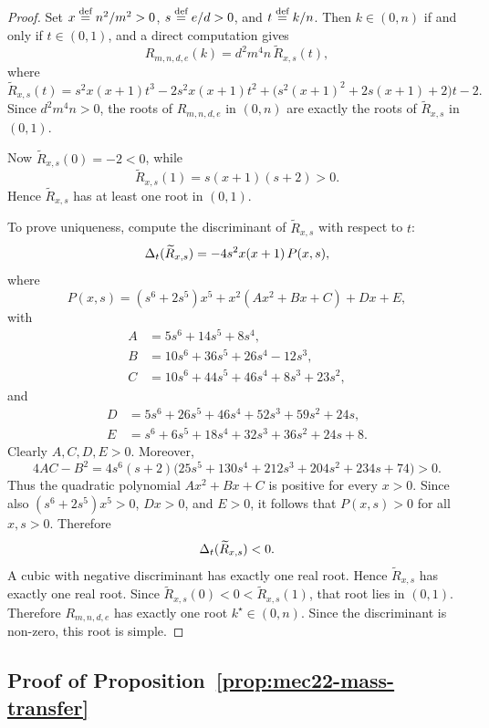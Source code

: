 \begin{proof}
Set \(x\stackrel{\text{def}}{=} n^2/m^2>0\), \(s\stackrel{\text{def}}{=} e/d>0\), and \(t\stackrel{\text{def}}{=} k/n\). Then \(k\in(0,n)\) if and only if \(t\in(0,1)\), and a direct computation gives
\[
R_{m,n,d,e}(k)=d^2m^4n\,\widetilde R_{x,s}(t),
\]
where
\[
\widetilde R_{x,s}(t)
=
s^2x(x+1)t^3-2s^2x(x+1)t^2+\bigl(s^2(x+1)^2+2s(x+1)+2\bigr)t-2.
\]
Since \(d^2m^4n>0\), the roots of \(R_{m,n,d,e}\) in \((0,n)\) are exactly the roots of \(\widetilde R_{x,s}\) in \((0,1)\).

Now \(\widetilde R_{x,s}(0)=-2<0\), while
\[
\widetilde R_{x,s}(1)=s(x+1)(s+2)>0.
\]
Hence \(\widetilde R_{x,s}\) has at least one root in \((0,1)\).

To prove uniqueness, compute the discriminant of \(\widetilde R_{x,s}\) with respect to \(t\):
\[
\Delta_t(\widetilde R_{x,s})=-4s^2x(x+1)\,P(x,s),
\]
where
\[
P(x,s)=(s^6+2s^5)x^5+x^2(Ax^2+Bx+C)+Dx+E,
\]
with
\[
\begin{aligned}
A&=5s^6+14s^5+8s^4,\\
B&=10s^6+36s^5+26s^4-12s^3,\\
C&=10s^6+44s^5+46s^4+8s^3+23s^2,
\end{aligned}
\]
and
\[
\begin{aligned}
D&=5s^6+26s^5+46s^4+52s^3+59s^2+24s,\\
E&=s^6+6s^5+18s^4+32s^3+36s^2+24s+8.
\end{aligned}
\]
Clearly \(A,C,D,E>0\). Moreover,
\[
4AC-B^2
=
4s^6(s+2)\bigl(25s^5+130s^4+212s^3+204s^2+234s+74\bigr)>0.
\]
Thus the quadratic polynomial \(Ax^2+Bx+C\) is positive for every \(x>0\). Since also \((s^6+2s^5)x^5>0\), \(Dx>0\), and \(E>0\), it follows that \(P(x,s)>0\) for all \(x,s>0\). Therefore
\[
\Delta_t(\widetilde R_{x,s})<0.
\]
A cubic with negative discriminant has exactly one real root. Hence \(\widetilde R_{x,s}\) has exactly one real root. Since \(\widetilde R_{x,s}(0)<0<\widetilde R_{x,s}(1)\), that root lies in \((0,1)\). Therefore \(R_{m,n,d,e}\) has exactly one root \(k^\star\in(0,n)\). Since the discriminant is non-zero, this root is simple.
\end{proof}

\subsection*{Proof of Proposition~\ref{prop:mec22-mass-transfer}}

